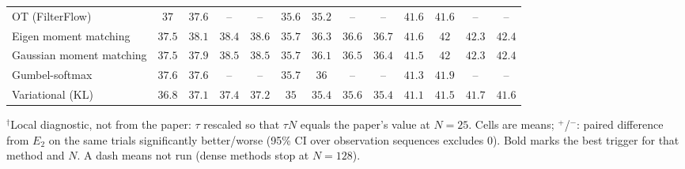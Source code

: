 \begin{table}[ht]
\begin{adjustbox}{max width=\linewidth}
\begin{tabular}{lcccc|cccc|cccc}
OT (FilterFlow) & $37$ & $37.6$ & -- & -- & $35.6$ & $35.2$ & -- & -- & $41.6$ & $41.6$ & -- & -- \\
Eigen moment matching & $37.5$ & $38.1$ & $38.4$ & $38.6$ & $35.7$ & $36.3$ & $36.6$ & $36.7$ & $41.6$ & $42$ & $42.3$ & $42.4$ \\
Gaussian moment matching & $37.5$ & $37.9$ & $38.5$ & $38.5$ & $35.7$ & $36.1$ & $36.5$ & $36.4$ & $41.5$ & $42$ & $42.3$ & $42.4$ \\
Gumbel-softmax & $37.6$ & $37.6$ & -- & -- & $35.7$ & $36$ & -- & -- & $41.3$ & $41.9$ & -- & -- \\
Variational (KL) & $36.8$ & $37.1$ & $37.4$ & $37.2$ & $35$ & $35.4$ & $35.6$ & $35.4$ & $41.1$ & $41.5$ & $41.7$ & $41.6$ \\
\bottomrule
\end{tabular}
\end{adjustbox}
\par\smallskip\parbox{0.95\linewidth}{\footnotesize $^\dagger$Local diagnostic, not from the paper: $\tau$ rescaled so that $\tau N$ equals the paper's value at $N{=}25$. Cells are means; $^{+}$/$^{-}$: paired difference from $E_2$ on the same trials significantly better/worse (95\% CI over observation sequences excludes 0). Bold marks the best trigger for that method and $N$. A dash means not run (dense methods stop at $N{=}128$).}
\end{table}

